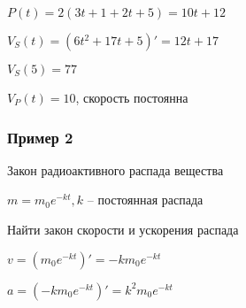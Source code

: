 $ P(t) = 2(3t+1+2t+5) = 10t + 12 $

$ V_{S}(t) = (6t^{2} + 17t + 5)' = 12t + 17 $

$ V_{S}(5) = 77 $

$ V_{P}(t) = 10 $, скорость постоянна

\subsubsection{Пример 2}

Закон радиоактивного распада вещества

$ m = m_0 e^{-kt}, k $ -- постоянная распада

Найти закон скорости и ускорения распада

$ v = (m_0 e^{-kt})' = -k m_0 e^{-kt} $

$ a = (-k m_0 e^{-kt})' = k^{2} m_0 e^{-kt} $